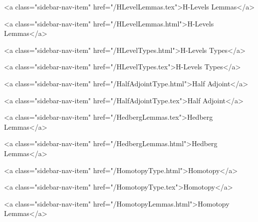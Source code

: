       
        
          <a class="sidebar-nav-item" href="/HLevelLemmas.tex">H-Levels Lemmas</a>
        
      
    
      
        
          <a class="sidebar-nav-item" href="/HLevelLemmas.html">H-Levels Lemmas</a>
        
      
    
      
        
          <a class="sidebar-nav-item" href="/HLevelTypes.html">H-Levels Types</a>
        
      
    
      
        
          <a class="sidebar-nav-item" href="/HLevelTypes.tex">H-Levels Types</a>
        
      
    
      
        
          <a class="sidebar-nav-item" href="/HalfAdjointType.html">Half Adjoint</a>
        
      
    
      
        
          <a class="sidebar-nav-item" href="/HalfAdjointType.tex">Half Adjoint</a>
        
      
    
      
        
          <a class="sidebar-nav-item" href="/HedbergLemmas.tex">Hedberg Lemmas</a>
        
      
    
      
        
          <a class="sidebar-nav-item" href="/HedbergLemmas.html">Hedberg Lemmas</a>
        
      
    
      
        
          <a class="sidebar-nav-item" href="/HomotopyType.html">Homotopy</a>
        
      
    
      
        
          <a class="sidebar-nav-item" href="/HomotopyType.tex">Homotopy</a>
        
      
    
      
        
          <a class="sidebar-nav-item" href="/HomotopyLemmas.html">Homotopy Lemmas</a>
        
      
    
